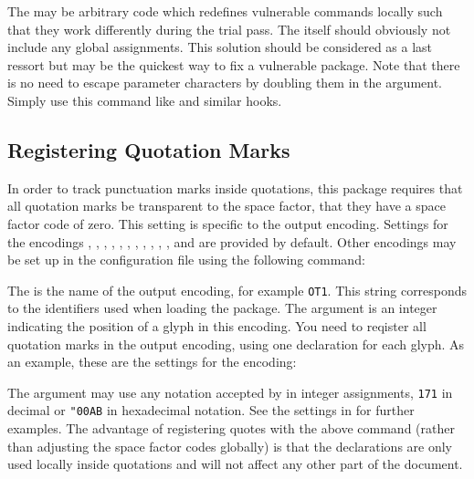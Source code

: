 \documentclass{ltxdockit}[2010/09/26]
\begin{document}
\begin{ltxsyntax}


The  may be arbitrary \latex code which redefines vulnerable commands locally such that they work differently during the trial pass. The  itself should obviously not include any global assignments. This solution should be considered as a last ressort but may be the quickest way to fix a vulnerable package. Note that there is no need to escape parameter characters by doubling them in the  argument. Simply use this command like  and similar hooks.

\end{ltxsyntax}

\subsection{Registering Quotation Marks}
\label{aut:sfc}

In order to track punctuation marks inside quotations, this package requires that all quotation marks be transparent to the space factor, \ie that they have a space factor code of zero. This setting is specific to the output encoding. Settings for the encodings , , , , , , , , , , , and  are provided by default. Other encodings may be set up in the configuration file using the following command:

\begin{ltxsyntax}
\end{ltxsyntax}

The  is the name of the output encoding, for example \texttt{OT1}. This string corresponds to the identifiers used when loading the  package. The  argument is an integer indicating the position of a glyph in this encoding. You need to reqister all quotation marks in the output encoding, using one declaration for each glyph. As an example, these are the settings for the  encoding:

\begin{ltxcode}
{}%
{}%
{}%
\end{ltxcode}
%
The  argument may use any notation accepted by \tex in integer assignments, \eg \texttt{171} in decimal or \verb+"00AB+ in hexadecimal notation. See the settings in  for further examples. The advantage of registering quotes with the above command (rather than adjusting the space factor codes globally) is that the declarations are only used locally inside quotations and will not affect any other part of the document.
\end{document}
